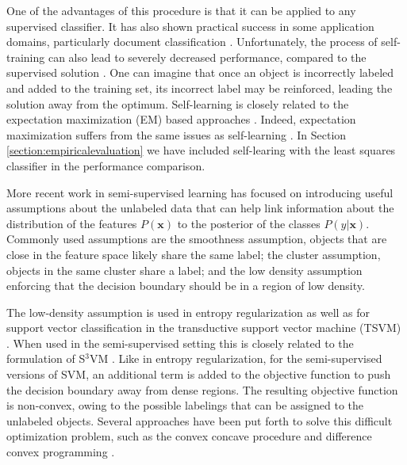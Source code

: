\documentclass{elsarticle}
\begin{document}
One of the advantages of this procedure is that it can be applied to any supervised classifier.
It has also shown practical success in some application domains, particularly document classification \cite{Nigam2000,Yarowsky1995}. 
Unfortunately, the process of self-training can also lead to severely decreased performance, compared to the supervised solution \cite{Cozman2003,Cozman2006}. 
One can imagine that once an object is incorrectly labeled and added to the training set, its incorrect label may be reinforced, leading the solution away from the optimum. 
Self-learning is closely related to the expectation maximization (EM) based approaches \cite{Abney2004}. Indeed, expectation maximization suffers from the same issues as self-learning \cite{Zhu2009}.
In Section \ref{section:empiricalevaluation} we have included self-learing with the least squares classifier in the performance comparison.

More recent work in semi-supervised learning has focused on introducing useful assumptions about the unlabeled data that can help link information about the distribution of the features $P(\mathbf{x})$ to the posterior of the classes $P(y|\mathbf{x})$.
Commonly used assumptions are the smoothness assumption, objects that are close in the feature space likely share the same label; the cluster assumption, objects in the same cluster share a label; and the low density assumption enforcing that the decision boundary should be in a region of low density. 


The low-density assumption is used in entropy regularization \cite{Grandvalet2005} as well as for support vector classification in the transductive support vector machine (TSVM)  \cite{Joachims1999}. 
When used in the semi-supervised setting this is closely related to the formulation of S$^3$VM \cite{Bennett1998,Sindhwani2006}. 
Like in entropy regularization, for the semi-supervised versions of SVM, an additional term is added to the objective function to push the decision boundary away from dense regions. 
The resulting objective function is non-convex, owing to the possible labelings that can be assigned to the unlabeled objects. 
Several approaches have been put forth to solve this difficult optimization problem, such as the convex concave procedure \cite{Collobert2006} and difference convex programming \cite{Sindhwani2006,Wang2007}.
\end{document}
